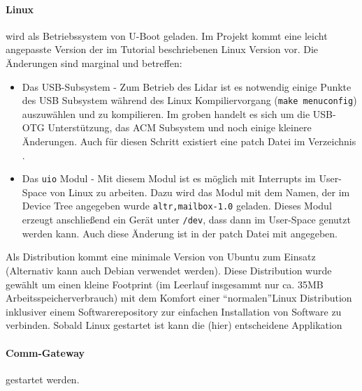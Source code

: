 \paragraph{Linux} wird als Betriebssystem von U-Boot geladen. Im Projekt kommt eine leicht angepasste Version der im Tutorial beschriebenen Linux Version vor. Die Änderungen sind marginal und betreffen:
\begin{itemize}
	\item Das USB-Subsystem - Zum Betrieb des \ac{Lidar} ist es notwendig einige Punkte des USB Subsystem während des Linux Kompiliervorgang (\lstinline|make menuconfig|) auszuwählen und zu kompilieren. Im groben handelt es sich um die USB-OTG Unterstützung, das ACM Subsystem und noch einige kleinere Änderungen. Auch für diesen Schritt existiert eine patch Datei im Verzeichnis .
	\item Das \texttt{uio} Modul - Mit diesem Modul ist es möglich mit Interrupts im User-Space von Linux zu arbeiten. Dazu wird das Modul mit dem Namen, der im Device Tree angegeben wurde \lstinline|altr,mailbox-1.0| geladen. Dieses Modul erzeugt anschließend ein Gerät unter \texttt{/dev}, dass dann im User-Space genutzt werden kann. Auch diese Änderung ist in der patch Datei mit angegeben.
\end{itemize}
Als Distribution kommt eine minimale Version von Ubuntu zum Einsatz (Alternativ kann auch Debian verwendet werden). Diese Distribution wurde gewählt um einen kleine Footprint (im Leerlauf insgesammt nur ca. 35MB Arbeitsspeicherverbrauch) mit dem Komfort einer \textquotedblleft normalen\textquotedblright Linux Distribution inklusiver einem Softwarerepository zur einfachen Installation von Software zu verbinden. Sobald Linux gestartet ist kann die (hier) entscheidene Applikation

\paragraph{Comm-Gateway} gestartet werden.


